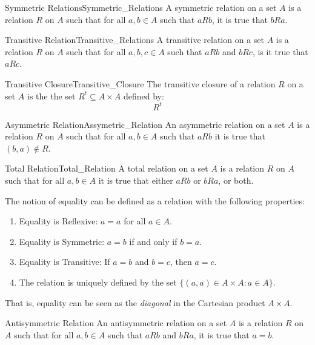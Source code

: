     \begin{fdefinition}{Symmetric Relations}{Symmetric_Relations}
        A symmetric relation on a set $A$ is a
        relation $R$ on $A$ such that for all $a,b\in{A}$
        such that $aRb$, it is true that $bRa$.
    \end{fdefinition}
    \begin{fdefinition}{Transitive Relation}{Transitive_Relations}
        A transitive relation on a set $A$ is a relation $R$ on $A$
        such that for all $a,b,c\in{A}$ such that $aRb$ and $bRc$,
        is it true that $aRc$.
    \end{fdefinition}
    \begin{fdefinition}{Transitive Closure}{Transitive_Closure}
        The transitive closure of a relation $R$ on a set
        $A$ is the the set $R^{t}\subseteq{A}\times{A}$ defined by:
        \begin{equation}
            R^{t}
        \end{equation}
    \end{fdefinition}
    \begin{fdefinition}{Asymmetric Relation}{Assymetric_Relation}
        An asymmetric relation on a set $A$ is a relation $R$
        on $A$ such that for all $a,b\in{A}$ such that $aRb$
        it is true that $(b,a)\notin{R}$.
    \end{fdefinition}
    \begin{fdefinition}{Total Relation}{Total_Relation}
        A total relation on a set $A$ is a relation $R$ on $A$ such
        that for all $a,b\in{A}$ it is true that either
        $aRb$ or $bRa$, or both.
    \end{fdefinition}
    The notion of equality can be defined as a relation
    with the following properties:
    \begin{enumerate}
        \item Equality is Reflexive: $a=a$ for all $a\in{A}$.
        \item Equality is Symmetric: $a=b$ if and only if $b=a$.
        \item Equality is Transitive: If $a=b$ and $b=c$, then $a=c$.
        \item The relation is uniquely defined by the set
              $\{(a,a)\in A\times A:a\in A\}$.
    \end{enumerate}
    That is, equality can be seen as the \textit{diagonal} in the
    Cartesian product $A\times{A}$.
    \begin{fdefinition}{Antisymmetric Relation}
        An antisymmetric relation on a set $A$ is a relation $R$ on $A$
        such that for all $a,b\in{A}$ such that $aRb$ and $bRa$, it
        is true that $a=b$.
    \end{fdefinition}